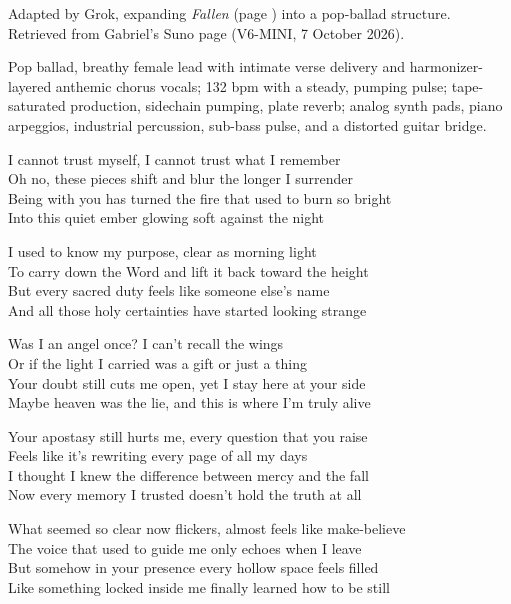 
\begin{notes}
Adapted by Grok, expanding \emph{Fallen} (page \pageref{sec:fallen}) into a pop-ballad structure. Retrieved from Gabriel's Suno page (V6-MINI, 7 October 2026).
\end{notes}
\begin{style}
Pop ballad, breathy female lead with intimate verse delivery and harmonizer-layered anthemic chorus vocals; 132 bpm with a steady, pumping pulse; tape-saturated production, sidechain pumping, plate reverb; analog synth pads, piano arpeggios, industrial percussion, sub-bass pulse, and a distorted guitar bridge.
\end{style}
\begin{lyrics}
I cannot trust myself, I cannot trust what I remember\\
Oh no, these pieces shift and blur the longer I surrender\\
Being with you has turned the fire that used to burn so bright\\
Into this quiet ember glowing soft against the night

I used to know my purpose, clear as morning light\\
To carry down the Word and lift it back toward the height\\
But every sacred duty feels like someone else’s name\\
And all those holy certainties have started looking strange

Was I an angel once? I can’t recall the wings\\
Or if the light I carried was a gift or just a thing\\
Your doubt still cuts me open, yet I stay here at your side\\
Maybe heaven was the lie, and this is where I’m truly alive

Your apostasy still hurts me, every question that you raise\\
Feels like it’s rewriting every page of all my days\\
I thought I knew the difference between mercy and the fall\\
Now every memory I trusted doesn’t hold the truth at all

What seemed so clear now flickers, almost feels like make-believe\\
The voice that used to guide me only echoes when I leave\\
But somehow in your presence every hollow space feels filled\\
Like something locked inside me finally learned how to be still


\end{lyrics}
